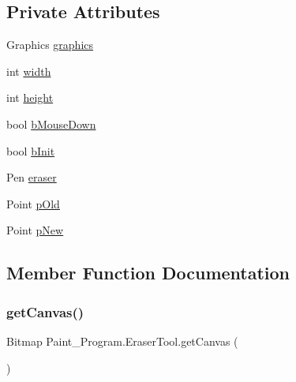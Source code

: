 \subsection*{Private Attributes}
\begin{DoxyCompactItemize}
\item 
Graphics \mbox{\hyperlink{class_paint___program_1_1_eraser_tool_aa794270854644c4048ec6c5c9b736a5a}{graphics}}
\item 
int \mbox{\hyperlink{class_paint___program_1_1_eraser_tool_a1f5259755f77615d916ab2ae24693140}{width}}
\item 
int \mbox{\hyperlink{class_paint___program_1_1_eraser_tool_a0497307d3c637fb660f3c0eff78492dd}{height}}
\item 
bool \mbox{\hyperlink{class_paint___program_1_1_eraser_tool_aa9a395b0a38588a13f4da3051385d681}{b\+Mouse\+Down}}
\item 
bool \mbox{\hyperlink{class_paint___program_1_1_eraser_tool_a35b968ab72538ac17fa1e80514995f32}{b\+Init}}
\item 
Pen \mbox{\hyperlink{class_paint___program_1_1_eraser_tool_a44e140b7e6cba937f70e9a6323e0e6fb}{eraser}}
\item 
Point \mbox{\hyperlink{class_paint___program_1_1_eraser_tool_a269895ea6587d5910d6d5024880fbfd5}{p\+Old}}
\item 
Point \mbox{\hyperlink{class_paint___program_1_1_eraser_tool_ac9df8dc4a5d2881363c0fd652d4b525d}{p\+New}}
\end{DoxyCompactItemize}


\subsection{Member Function Documentation}
\mbox{\label{class_paint___program_1_1_eraser_tool_ab06fce2e3aefa1a4ce27e861f8036923}} 
\subsubsection{\texorpdfstring{get\+Canvas()}{getCanvas()}}
{\footnotesize\ttfamily Bitmap Paint\+\_\+\+Program.\+Eraser\+Tool.\+get\+Canvas (\begin{DoxyParamCaption}{ }\end{DoxyParamCaption})\hspace{0.3cm}{\ttfamily [inline]}}

